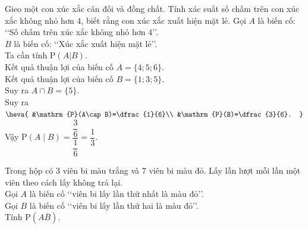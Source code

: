 \begin{bt}%

Gieo một con xúc xắc cân đối và đồng chất. Tính xác suất số chấm trên con xúc xắc không nhỏ hơn $4$, biết rằng con xúc xắc xuất hiện mặt lẻ.
\loigiai
{
Gọi $A$ là biến cố: \lq\lq Số chấm trên xúc xắc không nhỏ hơn $4$\rq\rq.\\
$B$ là biến cố: \lq\lq Xúc xắc xuất hiện mặt lẻ\rq\rq.\\
Ta cần tính $\mathrm{P}(A| B)$.\\
Kết quả thuận lợi của biến cố $A=\{4;5;6\}$.\\
Kết quả thuận lợi của biến cố $B=\{1;3;5\}$.\\
Suy ra $A\cap B=\{5\}$.\\
Suy ra $\heva{
&\mathrm{P}(A\cap B)=\dfrac{1}{6}\\
&\mathrm{P}(B)=\dfrac{3}{6}.
}$\\
Vậy $\mathrm{P}(A\mid B)=\dfrac{\dfrac{3}{6}}{\dfrac{1}{6}}=\dfrac{1}{3}$.
}
\end{bt}

\begin{bt}%

	Trong hộp có $3$ viên bi màu trắng và $7$ viên bi màu đỏ. Lấy lần lượt mỗi lần một viên theo cách lấy không trả lại.\\
	Gọi $A$ là biến cố \lq\lq viên bi lấy lần thứ nhất là màu đỏ\rq\rq.\\
	Gọi $B$ là biến cố \lq\lq viên bi lấy lần thứ hai là màu đỏ\rq\rq.\\
	Tính $\mathrm{P}(A\overline{B})$.
\end{bt}

